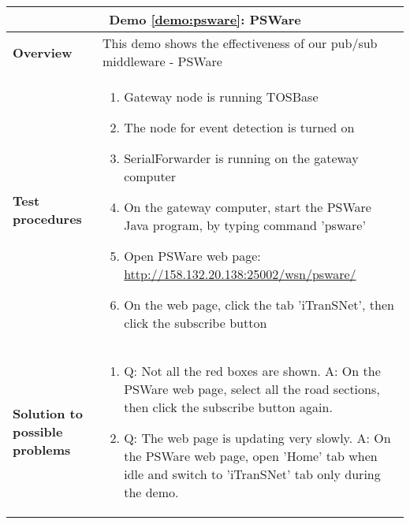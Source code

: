 \begin{center}
	\begin{tabular}{ | p{2cm} | p{10cm} | }
		\hline
		\multicolumn{2}{|c|}{\textbf{Demo \ref{demo:psware}: PSWare}} \\ \hline
		\textbf{Overview} &  This demo shows the effectiveness of our pub/sub middleware - PSWare \\ \hline
		\textbf{Test procedures} &
		\begin{enumerate}
		\item Gateway node is running TOSBase
		\item The node for event detection is turned on
		\item SerialForwarder is running on the gateway computer
		\item On the gateway computer, start the PSWare Java program, by typing command 'psware'
		\item Open PSWare web page: \url{http://158.132.20.138:25002/wsn/psware/}
		\item On the web page, click the tab 'iTranSNet', then click the subscribe button
		\end{enumerate} \\ \hline
		\textbf{Solution to possible problems} &
		\begin{enumerate}
		\item Q: Not all the red boxes are shown. A: On the PSWare web page, select all the road sections, then click the subscribe button again.
		\item Q: The web page is updating very slowly. A: On the PSWare web page, open 'Home' tab when idle and switch to 'iTranSNet' tab only during the demo.
		\end{enumerate}  \\
		\hline
	\end{tabular}
\end{center}
